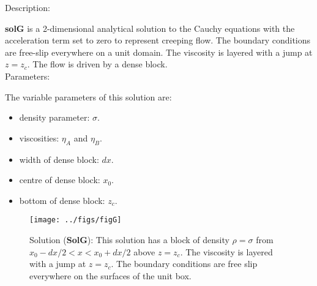   {\large \fontB Description:}
  
  {\bf solG} is a 2-dimensional analytical solution to the Cauchy equations with the acceleration term set to zero
  to represent creeping flow. The boundary conditions are free-slip everywhere on a unit domain. 
  The viscosity is layered with a jump at $ z=z_c $.
  The flow is driven by a dense block.
  \\

  {\large \fontB Parameters:}
 
  The variable parameters of this solution are:
  \begin{itemize}
    \item{density parameter: $ \sigma $.}
    \item{viscosities: $\eta_A$ and $\eta_B$.}
    \item{width of dense block: $dx$.}
    \item{centre of dense block: $x_0$.}
    \item{bottom of dense block: $z_c$.}
    \end{itemize}

  \begin{SCfigure}[][h]
    \texttt{[image: ../figs/figG]}
    \caption[Short caption]{\label{figG} 
      Solution ({\bf SolG}):
      This solution has a block of density $\rho = \sigma$ from $x_0-dx/2 < x < x_0+dx/2$ above
      $ z= z_c$.
      The viscosity is layered with a jump at $ z=z_c $.
      The boundary conditions are free slip everywhere on the surfaces of the unit box.}
  \end{SCfigure} 
  

